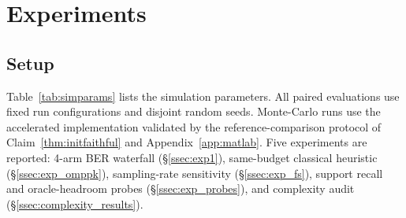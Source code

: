 \section{Experiments}
\label{sec:results}

\subsection{Setup}
\label{ssec:setup}

Table~\ref{tab:simparams} lists the simulation parameters. All paired
evaluations use fixed run configurations and disjoint random seeds.
Monte-Carlo runs use the accelerated implementation validated by the
reference-comparison protocol of Claim~\ref{thm:initfaithful} and
Appendix~\ref{app:matlab}. Five experiments
are reported: 4-arm BER waterfall (\S\ref{ssec:exp1}), same-budget
classical heuristic (\S\ref{ssec:exp_omppk}), sampling-rate sensitivity
(\S\ref{ssec:exp_fs}), support recall and oracle-headroom probes
(\S\ref{ssec:exp_probes}), and complexity audit
(\S\ref{ssec:complexity_results}).

\begin{table}[t]
\centering
\caption{Simulation parameters. One configuration used for every receiver in every experiment.}
\label{tab:simparams}
\end{table}

